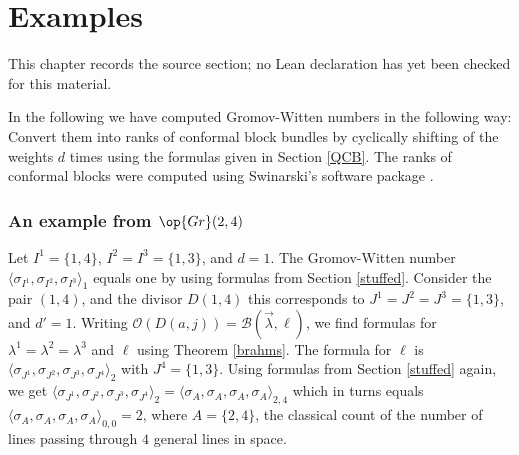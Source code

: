 \chapter{Examples}
\label{rigid-local-systems-multiplicative-eigenvalue-problem-chapter-13}

\begin{remark}
\label{rigid-local-systems-multiplicative-eigenvalue-problem-chapter-13-source}
This chapter records the source section; no Lean declaration has yet been checked for this material.
\notready
\end{remark}

\label{somemore}
In the following we have computed Gromov-Witten numbers in the following way: Convert them into ranks of conformal block bundles by cyclically shifting of the weights $d$ times using the formulas given in Section \ref{QCB}. The ranks of conformal blocks were computed using Swinarski's software package \cite{Swin}.

\subsection{An example from $\op{Gr}(2,4)$}\label{oldie}
Let $I^1=\{1,4\}$,  $I^2=I^3=\{1,3\}$, and $d=1$. The Gromov-Witten number $\langle \sigma_{I^1},\sigma_{I^2},\sigma_{I^3}\rangle_1$ equals one by using formulas from Section \ref{stuffed}. Consider the pair $(1,4)$, and the divisor $D(1,4)$ this corresponds to $J^1=J^2=J^3=\{1,3\}$, and $d'=1$. Writing $\mathcal{O}(D(a,j))=\mathcal{B}(\vec{\lambda},\ell)$, we find formulas for $\lambda^1=\lambda^2=\lambda^3$ and $\ell$ using Theorem \ref{brahms}. The formula for $\ell$ is  $\langle \sigma_{J^1},\sigma_{J^2},\sigma_{J^3},\sigma_{J^4}\rangle_2$ with $J^4=\{1,3\}$. Using formulas from Section \ref{stuffed} again, we get
$\langle \sigma_{J^1},\sigma_{J^2},\sigma_{J^3},\sigma_{J^4}\rangle_2=\langle \sigma_{A},\sigma_{A},\sigma_{A},\sigma_{A}\rangle_{2,4}$ which in turns equals
$\langle \sigma_{A},\sigma_{A},\sigma_{A},\sigma_{A}\rangle_{0,0}=2$, where $A=\{2,4\}$, the classical count of the number of lines passing through $4$ general lines in space.

